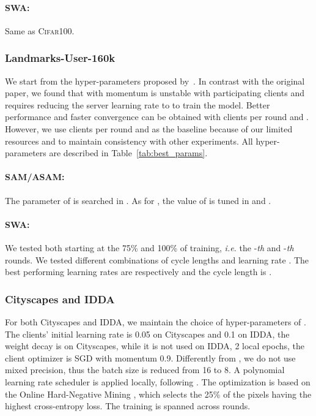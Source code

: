 \paragraph{SWA:} Same as \textsc{Cifar100}.

\subsubsection{Landmarks-User-160k} We start from the hyper-parameters proposed by~\cite{hsu2020federated}. In contrast with the original paper, we found that \fedavgm with momentum  is unstable with  participating clients and requires reducing the server learning rate to  to train the model. Better performance and faster convergence can be obtained with  clients per round and . However, we use  clients per round and \fedavg as the baseline because of our limited resources and to maintain consistency with other experiments. All hyper-parameters are described in Table~\ref{tab:best_params}.

\paragraph{SAM/ASAM:} The parameter  of \sam is searched in . As for \asam, the value of  is tuned in  and .

\paragraph{SWA:} We tested both \swa starting at the 75\% and 100\% of training, \textit{i.e.} the -\textit{th} and -\textit{th} rounds. We tested different combinations of cycle lengths  and learning rate . The best performing learning rates  are respectively  and the cycle length is .

\subsubsection{Cityscapes and IDDA} For both Cityscapes and IDDA, we maintain the choice of hyper-parameters of \cite{fantauzzo2022feddrive}. The clients' initial learning rate is 0.05 on Cityscapes and 0.1 on IDDA, the weight decay is  on Cityscapes, while it is not used on IDDA, 2 local epochs, the client optimizer is SGD with momentum 0.9. Differently from \cite{fantauzzo2022feddrive}, we do not use mixed precision, thus the batch size is reduced from 16 to 8. A polynomial learning rate scheduler is applied locally, following \cite{yu2021bisenet}. The optimization is based on the Online Hard-Negative Mining \cite{shrivastava2016training}, which selects the 25\% of the pixels having the highest cross-entropy loss. The training is spanned across  rounds. 

